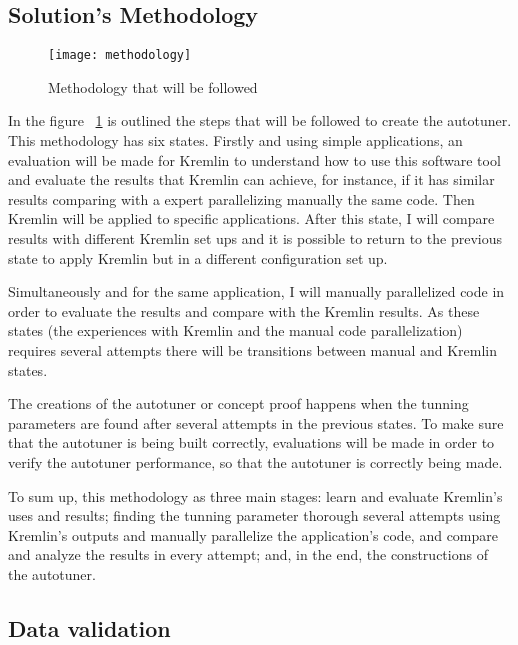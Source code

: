 \subsection{Solution's Methodology}
\begin{figure}[t]
  \begin{center}
    \leavevmode
    \texttt{[image: methodology]}
    \caption{Methodology that will be followed}
    \label{fig:method}
  \end{center}
\end{figure}

In the  figure ~\ref{fig:method} is outlined the steps that will be followed to create the autotuner. This methodology has six states. Firstly and using simple applications, an evaluation will be made for Kremlin to understand how to use this software tool and evaluate the results that Kremlin can achieve, for instance, if it has similar results comparing with a expert parallelizing manually the same code. Then Kremlin will be applied to specific applications. After this state, I will compare results with different Kremlin set ups and it is possible to return to the previous state to apply Kremlin but in a different configuration set up.

Simultaneously and for the same application, I will manually parallelized code in order to evaluate the results and compare with the Kremlin results. As these states (the experiences with Kremlin and the manual code parallelization) requires several attempts there will be transitions between manual and Kremlin states. 

The creations of the autotuner or concept proof happens when the tunning parameters are found after several attempts in the previous states. To make sure that the autotuner is being built correctly, evaluations will be made in order to verify the autotuner performance, so that the autotuner is correctly being made.

To sum up, this methodology as three main stages: learn and evaluate  Kremlin's uses and results; finding the tunning parameter thorough several attempts using Kremlin's outputs and manually parallelize the application's code, and compare and analyze the results in every attempt; and, in the end, the constructions of the autotuner.


\subsection{Data validation}

